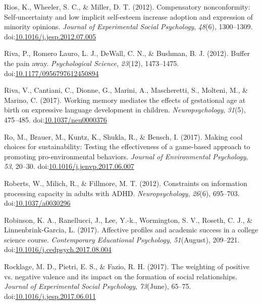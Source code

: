 \documentclass[english,man]{apa6}
\theoremstyle{definition}
\theoremstyle{definition}
\theoremstyle{definition}
\theoremstyle{remark}
\begin{document}
\hypertarget{ref-Rios2012}{}
Rios, K., Wheeler, S. C., \& Miller, D. T. (2012). Compensatory
nonconformity: Self-uncertainty and low implicit self-esteem increase
adoption and expression of minority opinions. \emph{Journal of
Experimental Social Psychology}, \emph{48}(6), 1300--1309.
doi:\href{https://doi.org/10.1016/j.jesp.2012.07.005}{10.1016/j.jesp.2012.07.005}

\hypertarget{ref-Riva2012}{}
Riva, P., Romero Lauro, L. J., DeWall, C. N., \& Bushman, B. J. (2012).
Buffer the pain away. \emph{Psychological Science}, \emph{23}(12),
1473--1475.
doi:\href{https://doi.org/10.1177/0956797612450894}{10.1177/0956797612450894}

\hypertarget{ref-Riva2017}{}
Riva, V., Cantiani, C., Dionne, G., Marini, A., Mascheretti, S.,
Molteni, M., \& Marino, C. (2017). Working memory mediates the effects
of gestational age at birth on expressive language development in
children. \emph{Neuropsychology}, \emph{31}(5), 475--485.
doi:\href{https://doi.org/10.1037/neu0000376}{10.1037/neu0000376}

\hypertarget{ref-Ro2017}{}
Ro, M., Brauer, M., Kuntz, K., Shukla, R., \& Bensch, I. (2017). Making
cool choices for sustainability: Testing the effectiveness of a
game-based approach to promoting pro-environmental behaviors.
\emph{Journal of Environmental Psychology}, \emph{53}, 20--30.
doi:\href{https://doi.org/10.1016/j.jenvp.2017.06.007}{10.1016/j.jenvp.2017.06.007}

\hypertarget{ref-Roberts2012}{}
Roberts, W., Milich, R., \& Fillmore, M. T. (2012). Constraints on
information processing capacity in adults with ADHD.
\emph{Neuropsychology}, \emph{26}(6), 695--703.
doi:\href{https://doi.org/10.1037/a0030296}{10.1037/a0030296}

\hypertarget{ref-Robinson2017}{}
Robinson, K. A., Ranellucci, J., Lee, Y.-k., Wormington, S. V., Roseth,
C. J., \& Linnenbrink-Garcia, L. (2017). Affective profiles and academic
success in a college science course. \emph{Contemporary Educational
Psychology}, \emph{51}(August), 209--221.
doi:\href{https://doi.org/10.1016/j.cedpsych.2017.08.004}{10.1016/j.cedpsych.2017.08.004}

\hypertarget{ref-Rocklage2017}{}
Rocklage, M. D., Pietri, E. S., \& Fazio, R. H. (2017). The weighting of
positive vs. negative valence and its impact on the formation of social
relationships. \emph{Journal of Experimental Social Psychology},
\emph{73}(June), 65--75.
doi:\href{https://doi.org/10.1016/j.jesp.2017.06.011}{10.1016/j.jesp.2017.06.011}
\end{document}
